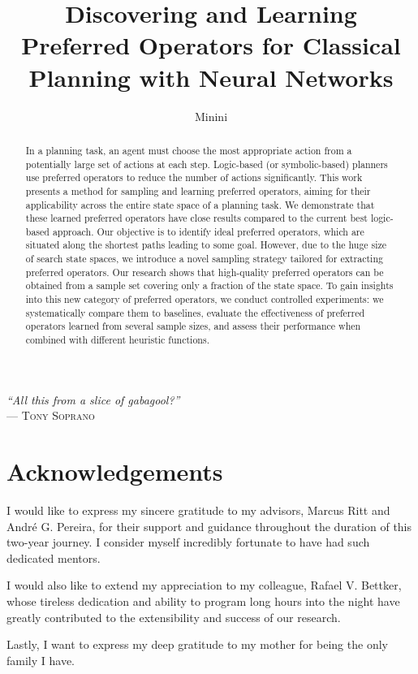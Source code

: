\documentclass[ppgc,diss,english]{iiufrgs}
\title{Discovering and Learning Preferred Operators for Classical Planning with Neural Networks}
\author{Minini}{Pedro Probst}
\begin{document}
\maketitle

\clearpage
\begin{flushright}
\mbox{}\vfill
{\sffamily\itshape
    ``All this from a slice of gabagool?''\\}
--- \textsc{Tony Soprano}
\end{flushright}

\chapter*{Acknowledgements}

I would like to express my sincere gratitude to my advisors, Marcus Ritt and André G. Pereira, for their support and guidance throughout the duration of this two-year journey. I consider myself incredibly fortunate to have had such dedicated mentors.

I would also like to extend my appreciation to my colleague, Rafael V. Bettker, whose tireless dedication and ability to program long hours into the night have greatly contributed to the extensibility and success of our research.

Lastly, I want to express my deep gratitude to my mother for being the only family I have.

\begin{abstract}
In a planning task, an agent must choose the most appropriate action from a potentially large set of actions at each step. Logic-based (or symbolic-based) planners use preferred operators to reduce the number of actions significantly. This work presents a method for sampling and learning preferred operators, aiming for their applicability across the entire state space of a planning task. We demonstrate that these learned preferred operators have close results compared to the current best logic-based approach.
Our objective is to identify ideal preferred operators, which are situated along the shortest paths leading to some goal. However, due to the huge size of search state spaces, we introduce a novel sampling strategy tailored for extracting preferred operators. Our research shows that high-quality preferred operators can be obtained from a sample set covering only a fraction of the state space.
To gain insights into this new category of preferred operators, we conduct controlled experiments: we systematically compare them to baselines, evaluate the effectiveness of preferred operators learned from several sample sizes, and assess their performance when combined with different heuristic functions.
\end{abstract}
\end{document}
